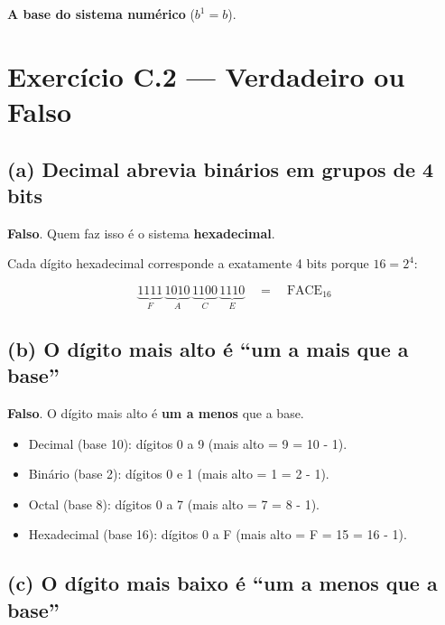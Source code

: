 \documentclass[11pt,a4paper]{article}
\begin{document}
\begin{resposta}\textbf{A base do sistema num\'erico} ($b^1 = b$).\end{resposta}

\section{Exerc\'icio C.2 --- Verdadeiro ou Falso}

\subsection*{(a) Decimal abrevia bin\'arios em grupos de 4 bits}

\begin{resposta}\textbf{Falso}. Quem faz isso \'e o sistema \textbf{hexadecimal}.\end{resposta}

Cada d\'igito hexadecimal corresponde a exatamente 4 bits porque $16 = 2^4$:

\[
\underbrace{1111}_{F} \, \underbrace{1010}_{A} \, \underbrace{1100}_{C} \, \underbrace{1110}_{E} \quad = \quad \text{FACE}_{16}
\]

\subsection*{(b) O d\'igito mais alto \'e ``um a mais que a base''}

\begin{resposta}\textbf{Falso}. O d\'igito mais alto \'e \textbf{um a menos} que a base.\end{resposta}

\begin{itemize}[leftmargin=*,itemsep=0pt]
  \item Decimal (base 10): d\'igitos 0 a 9 (mais alto = 9 = 10 - 1).
  \item Bin\'ario (base 2): d\'igitos 0 e 1 (mais alto = 1 = 2 - 1).
  \item Octal (base 8): d\'igitos 0 a 7 (mais alto = 7 = 8 - 1).
  \item Hexadecimal (base 16): d\'igitos 0 a F (mais alto = F = 15 = 16 - 1).
\end{itemize}

\subsection*{(c) O d\'igito mais baixo \'e ``um a menos que a base''}
\end{document}
